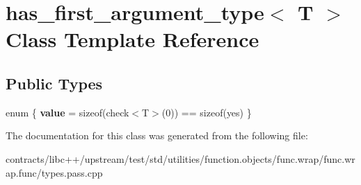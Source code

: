 \hypertarget{classhas__first__argument__type}{}\section{has\+\_\+first\+\_\+argument\+\_\+type$<$ T $>$ Class Template Reference}
\label{classhas__first__argument__type}
\subsection*{Public Types}
\begin{DoxyCompactItemize}
\item 
\mbox{\label{classhas__first__argument__type_af955580d8990a632057daf6211cde926}} 
enum \{ {\bfseries value} = sizeof(check$<$T$>$(0)) == sizeof(yes)
 \}
\end{DoxyCompactItemize}


The documentation for this class was generated from the following file\+:\begin{DoxyCompactItemize}
\item 
contracts/libc++/upstream/test/std/utilities/function.\+objects/func.\+wrap/func.\+wrap.\+func/types.\+pass.\+cpp\end{DoxyCompactItemize}
